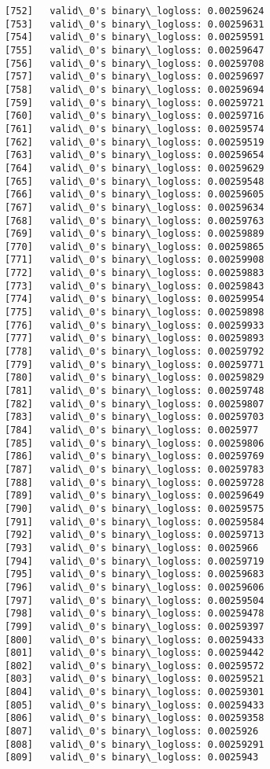 \documentclass[11pt]{article}
\begin{document}
\begin{Verbatim}[commandchars=\\\{\}]
[752]	valid\_0's binary\_logloss: 0.00259624
[753]	valid\_0's binary\_logloss: 0.00259631
[754]	valid\_0's binary\_logloss: 0.00259591
[755]	valid\_0's binary\_logloss: 0.00259647
[756]	valid\_0's binary\_logloss: 0.00259708
[757]	valid\_0's binary\_logloss: 0.00259697
[758]	valid\_0's binary\_logloss: 0.00259694
[759]	valid\_0's binary\_logloss: 0.00259721
[760]	valid\_0's binary\_logloss: 0.00259716
[761]	valid\_0's binary\_logloss: 0.00259574
[762]	valid\_0's binary\_logloss: 0.00259519
[763]	valid\_0's binary\_logloss: 0.00259654
[764]	valid\_0's binary\_logloss: 0.00259629
[765]	valid\_0's binary\_logloss: 0.00259548
[766]	valid\_0's binary\_logloss: 0.00259605
[767]	valid\_0's binary\_logloss: 0.00259634
[768]	valid\_0's binary\_logloss: 0.00259763
[769]	valid\_0's binary\_logloss: 0.00259889
[770]	valid\_0's binary\_logloss: 0.00259865
[771]	valid\_0's binary\_logloss: 0.00259908
[772]	valid\_0's binary\_logloss: 0.00259883
[773]	valid\_0's binary\_logloss: 0.00259843
[774]	valid\_0's binary\_logloss: 0.00259954
[775]	valid\_0's binary\_logloss: 0.00259898
[776]	valid\_0's binary\_logloss: 0.00259933
[777]	valid\_0's binary\_logloss: 0.00259893
[778]	valid\_0's binary\_logloss: 0.00259792
[779]	valid\_0's binary\_logloss: 0.00259771
[780]	valid\_0's binary\_logloss: 0.00259829
[781]	valid\_0's binary\_logloss: 0.00259748
[782]	valid\_0's binary\_logloss: 0.00259807
[783]	valid\_0's binary\_logloss: 0.00259703
[784]	valid\_0's binary\_logloss: 0.0025977
[785]	valid\_0's binary\_logloss: 0.00259806
[786]	valid\_0's binary\_logloss: 0.00259769
[787]	valid\_0's binary\_logloss: 0.00259783
[788]	valid\_0's binary\_logloss: 0.00259728
[789]	valid\_0's binary\_logloss: 0.00259649
[790]	valid\_0's binary\_logloss: 0.00259575
[791]	valid\_0's binary\_logloss: 0.00259584
[792]	valid\_0's binary\_logloss: 0.00259713
[793]	valid\_0's binary\_logloss: 0.0025966
[794]	valid\_0's binary\_logloss: 0.00259719
[795]	valid\_0's binary\_logloss: 0.00259683
[796]	valid\_0's binary\_logloss: 0.00259606
[797]	valid\_0's binary\_logloss: 0.00259504
[798]	valid\_0's binary\_logloss: 0.00259478
[799]	valid\_0's binary\_logloss: 0.00259397
[800]	valid\_0's binary\_logloss: 0.00259433
[801]	valid\_0's binary\_logloss: 0.00259442
[802]	valid\_0's binary\_logloss: 0.00259572
[803]	valid\_0's binary\_logloss: 0.00259521
[804]	valid\_0's binary\_logloss: 0.00259301
[805]	valid\_0's binary\_logloss: 0.00259433
[806]	valid\_0's binary\_logloss: 0.00259358
[807]	valid\_0's binary\_logloss: 0.0025926
[808]	valid\_0's binary\_logloss: 0.00259291
[809]	valid\_0's binary\_logloss: 0.0025943

\end{Verbatim}
\end{document}
